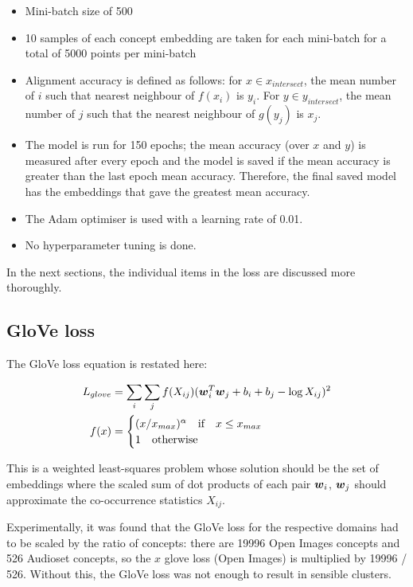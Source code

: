 \begin{itemize}
    \item Mini-batch size of 500
    \item 10 samples of each concept embedding are taken for each mini-batch for a total of 5000 points per mini-batch
    \item Alignment accuracy is defined as follows: for $x \in x_{intersect}$, the mean number of $i$ such that nearest neighbour of $f(x_i)$ is  $y_i$. For $y \in y_{intersect}$, the mean number of $j$ such that the nearest neighbour of $g(y_j)$ is $x_j$. 
    \item The model is run for 150 epochs; the mean accuracy (over $x$ and $y$) is measured after every epoch and the model is saved if the mean accuracy is greater than the last epoch mean accuracy. Therefore, the final saved model has the embeddings that gave the greatest mean accuracy. 
    \item The Adam optimiser is used with a learning rate of 0.01.
    \item No hyperparameter tuning is done. 
\end{itemize}

In the next sections, the individual items in the loss are discussed more thoroughly.

\subsection{GloVe loss}
\label{section:gloveloss}
The GloVe loss equation is restated here:

\begin{equation}
\begin{split}
L_{glove} &= \sum_i \sum_j f(X_{ij}) (\boldsymbol{w}_i^T \boldsymbol{w}_j + b_i + b_j - \log X_{ij})^2\\
f(x) &= \begin{cases}
(x/x_{max})^{\alpha}\quad \text{if} \quad x \le x_{max}\\
1\quad \text{otherwise} \quad
\end{cases}
\end{split}
\end{equation}

This is a weighted least-squares problem whose solution should be the set of embeddings where the scaled sum of dot products of each pair $\boldsymbol{w}_i$, $\boldsymbol{w}_j$ should approximate the co-occurrence statistics $X_{ij}$. 

Experimentally, it was found that the GloVe loss for the respective domains had to be scaled by the ratio of concepts: there are 19996 Open Images concepts and 526 Audioset concepts, so the $x$ glove loss (Open Images) is multiplied by 19996 / 526. Without this, the GloVe loss was not enough to result in sensible clusters. 

